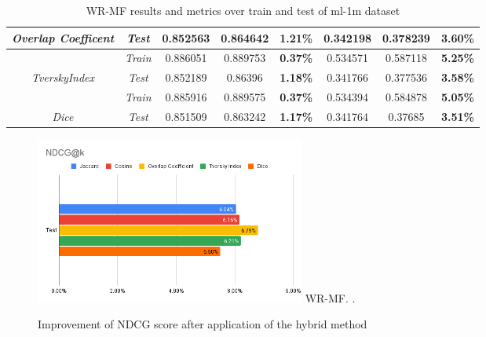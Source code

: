 \documentclass[journal]{IEEEtran}
\begin{document}
\begin{table}[htb]
{\begin{tabular}{|c|c|ccc|ccc|}
  \multirow{-2}{*}{\textit{Overlap Coefficent}}                   & \textit{Test}                  & \multicolumn{1}{c|}{0.852563}      & \multicolumn{1}{c|}{0.864642}      & \cellcolor[HTML]{F3F3F3}\textbf{1.21\%} & \multicolumn{1}{c|}{0.342198}       & \multicolumn{1}{c|}{0.378239}       & \cellcolor[HTML]{F3F3F3}\textbf{3.60\%} \\ \hline
  \cellcolor[HTML]{FFFFFF}                                        & \textit{Train}                 & \multicolumn{1}{c|}{0.886051}      & \multicolumn{1}{c|}{0.889753}      & \cellcolor[HTML]{F3F3F3}\textbf{0.37\%} & \multicolumn{1}{c|}{0.534571}       & \multicolumn{1}{c|}{0.587118}       & \cellcolor[HTML]{F3F3F3}\textbf{5.25\%} \\ \cline{2-8} 
  \multirow{-2}{*}{\cellcolor[HTML]{FFFFFF}\textit{TverskyIndex}} & \textit{Test}                  & \multicolumn{1}{c|}{0.852189}      & \multicolumn{1}{c|}{0.86396}       & \cellcolor[HTML]{F3F3F3}\textbf{1.18\%} & \multicolumn{1}{c|}{0.341766}       & \multicolumn{1}{c|}{0.377536}       & \cellcolor[HTML]{F3F3F3}\textbf{3.58\%} \\ \hline
                                                                  & \textit{Train}                 & \multicolumn{1}{c|}{0.885916}      & \multicolumn{1}{c|}{0.889575}      & \cellcolor[HTML]{F3F3F3}\textbf{0.37\%} & \multicolumn{1}{c|}{0.534394}       & \multicolumn{1}{c|}{0.584878}       & \cellcolor[HTML]{F3F3F3}\textbf{5.05\%} \\ \cline{2-8} 
  \multirow{-2}{*}{\textit{Dice}}                                 & \textit{Test}                  & \multicolumn{1}{c|}{0.851509}      & \multicolumn{1}{c|}{0.863242}      & \cellcolor[HTML]{F3F3F3}\textbf{1.17\%} & \multicolumn{1}{c|}{0.341764}       & \multicolumn{1}{c|}{0.37685}        & \cellcolor[HTML]{F3F3F3}\textbf{3.51\%} \\ \hline
  \end{tabular}%
  }
  \caption{WR-MF results and metrics over train and test of ml-1m dataset}
  \label{table:wrmf_scores}
\end{table}


\begin{figure}[!t]
  \centering
  \includegraphics[width=3.5in]{picture/WR_MF-NDCG@k.png}
  WR-MF.
  \DeclareGraphicsExtensions.
  \caption{Improvement of NDCG score after application of the hybrid method}
  \label{fig:wrmf_ndcg}
\end{figure}
\end{document}
